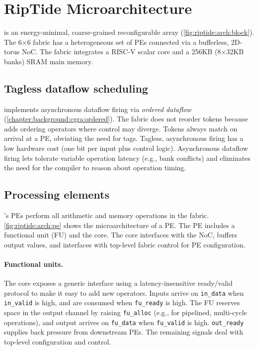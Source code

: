 \figRipTideArchBlock

\section{RipTide Microarchitecture}
\label{riptide:arch}

\riptide is an energy-minimal, \ulp coarse-grained reconfigurable array (\autoref{fig:riptide:arch:block}).
% 
The 6$\times$6 fabric has a
heterogeneous set of PEs connected via a bufferless, 2D-torus NoC.
% 
The fabric integrates a RISC-V scalar core and a 256KB
(8$\times$32KB banks) SRAM main memory.

\subsection{Tagless dataflow scheduling}

\riptide implements asynchronous dataflow firing via \emph{ordered dataflow} (\autoref{chapter:background:cgra:ordered}).
%
The fabric does not reorder tokens because \riptide adds ordering operators where
control may diverge.
%
Tokens always match on arrival at a PE, obviating the need for tags.
%
Tagless, asynchronous firing has a low hardware cost (one bit per input plus
control logic).
%
Asynchronous dataflow firing lets \riptide tolerate variable operation latency
(e.g., bank conflicts) and eliminates the need for the compiler to reason about
operation timing.

\subsection{Processing elements}
\riptide's PEs perform all arithmetic and memory operations in the fabric.
%
\autoref{fig:riptide:arch:pe} shows the microarchitecture of a PE.
% 
The PE includes a functional unit (FU) and the \textmu core.
% 
The \textmu core interfaces with the NoC, buffers
output values, and interfaces with top-level fabric control for PE configuration.

\paragraph{Functional units.}
The \textmu core exposes a generic interface using a
latency-insensitive ready/valid protocol to make it easy to add new
operators.
%
Inputs arrive on {\tt in\_data} when {\tt in\_valid} is high,
and are consumed when {\tt fu\_ready} is high.
%
The FU reserves space in the output channel by raising {\tt fu\_alloc}
(e.g., for pipelined, multi-cycle operations),
and output arrives on {\tt fu\_data} when {\tt fu\_valid} is high.
%
{\tt out\_ready} supplies back pressure from downstream PEs.
%
The remaining signals deal with top-level configuration and control.

